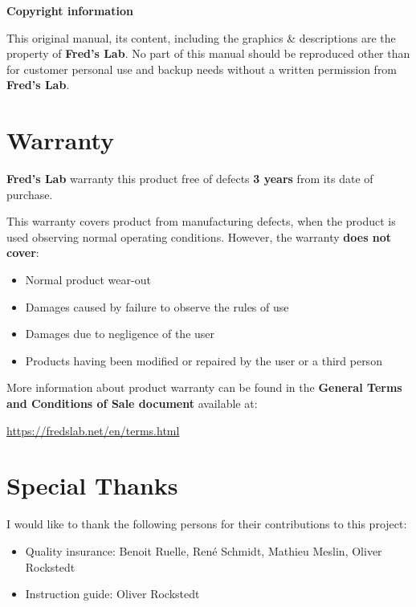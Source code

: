 \documentclass{scrartcl}
\begin{document}
\textbf{Copyright information}

This original manual, its content, including the graphics \& descriptions are the property of \textbf{Fred's Lab}. No part of this manual should be reproduced other than for customer personal use and backup needs without a written permission from \textbf{Fred's Lab}.

\pagebreak


\section{Warranty}
\textbf{Fred's Lab} warranty this product free of defects \textbf{3 years} from its
date of purchase.

This warranty covers product from manufacturing defects, when the product is used observing normal operating conditions. However, the warranty \textbf{does not cover}:

\begin{itemize}
    \item Normal product wear-out
    \item Damages caused by failure to observe the rules of use
    \item Damages due to negligence of the user
    \item Products having been modified or repaired by the user or a third person
\end{itemize}

More information about product warranty can be found in the \textbf{General Terms and Conditions of Sale document} available at:
\begin{center}
    \url{https://fredslab.net/en/terms.html}
\end{center}


\section{Special Thanks}

I would like to thank the following persons for their contributions to this project:

\begin{itemize}
    \item Quality insurance: Benoit Ruelle, René Schmidt, Mathieu Meslin, Oliver Rockstedt
    \item Instruction guide: Oliver Rockstedt
\end{itemize}
\end{document}
